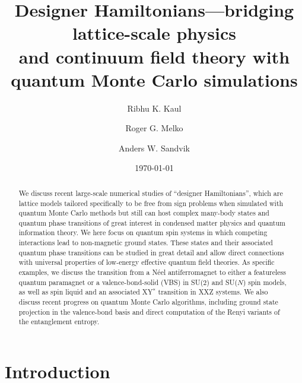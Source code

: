 \documentclass[aps,prb,groupedaddress,twocolumn]{revtex4}
\begin{document}
\title{Designer Hamiltonians---bridging lattice-scale physics \\ and continuum field theory with 
quantum Monte Carlo simulations} 

\author{Ribhu K. Kaul}
\author{Roger G. Melko}
\author{Anders W. Sandvik}


\date{\today}

\begin{abstract}
We discuss recent large-scale numerical studies of ``designer Hamiltonians'', which are lattice models tailored 
specifically to be free from sign problems when simulated with quantum Monte Carlo methods but still can host 
complex  many-body states and quantum phase transitions of great interest in condensed matter physics and quantum 
information theory. We here focus on quantum spin systems in which competing interactions lead to non-magnetic 
ground states. These states and their associated quantum phase transitions can be studied in great detail
and allow direct connections with universal properties of low-energy effective quantum field theories. As 
specific examples, we discuss the transition from a N\'eel antiferromagnet to either a featureless quantum 
paramagnet or a valence-bond-solid (VBS) in SU($2$) and SU($N$) spin models, as well as spin liquid and an
associated XY$^*$ transition in XXZ systems. We also discuss recent progress on quantum Monte Carlo algorithms, 
including ground state projection in the valence-bond basis and direct computation of the Renyi variants of 
the entanglement entropy.
\end{abstract}

\pacs{}


\maketitle

\section{Introduction}
\end{document}
